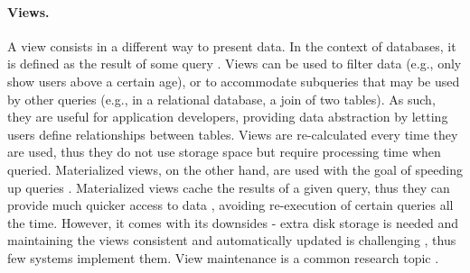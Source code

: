 \paragraph{Views.}
A view consists in a different way to present data.
In the context of databases, it is defined as the result of some query \cite{txcache}. %
Views can be used to filter data (e.g., only show users above a certain age), or to accommodate subqueries that may be used by other queries (e.g., in a relational database, a join of two tables).
As such, they are useful for application developers, providing data abstraction by letting users define relationships between tables.
Views are re-calculated every time they are used, thus they do not use storage space but require processing time when queried.
Materialized views, on the other hand, are used with the goal of speeding up queries \cite{noria, pequod, txcache, partView, viewSelection, incMaintenance, effMaintenance, lazyMaintenance}. %
Materialized views cache the results of a given query, thus they can provide much quicker access to data \cite{parcur, hadad, marviq}, avoiding re-execution of certain queries all the time.
However, it comes with its downsides - extra disk storage is needed and maintaining the views consistent and automatically updated is challenging \cite{oracleViews, dbsp, chronocache, birds, clickhouse}, thus few systems implement them.
View maintenance is a common research topic \cite{noria, dbsp, oracleViews}.

 
